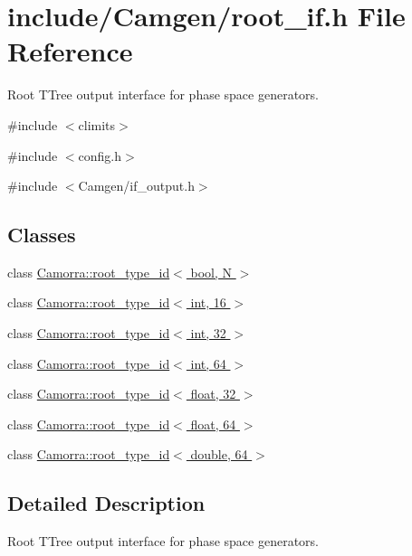 \hypertarget{a00624}{
\section{include/Camgen/root\_\-if.h File Reference}
\label{a00624}
}


Root TTree output interface for phase space generators.  


{\ttfamily \#include $<$climits$>$}\par
{\ttfamily \#include $<$config.h$>$}\par
{\ttfamily \#include $<$Camgen/if\_\-output.h$>$}\par
\subsection*{Classes}
\begin{DoxyCompactItemize}
\item 
class \hyperlink{a00468}{Camorra::root\_\-type\_\-id$<$ bool, N $>$}
\item 
class \hyperlink{a00472}{Camorra::root\_\-type\_\-id$<$ int, 16 $>$}
\item 
class \hyperlink{a00473}{Camorra::root\_\-type\_\-id$<$ int, 32 $>$}
\item 
class \hyperlink{a00474}{Camorra::root\_\-type\_\-id$<$ int, 64 $>$}
\item 
class \hyperlink{a00470}{Camorra::root\_\-type\_\-id$<$ float, 32 $>$}
\item 
class \hyperlink{a00471}{Camorra::root\_\-type\_\-id$<$ float, 64 $>$}
\item 
class \hyperlink{a00469}{Camorra::root\_\-type\_\-id$<$ double, 64 $>$}
\end{DoxyCompactItemize}


\subsection{Detailed Description}
Root TTree output interface for phase space generators. 